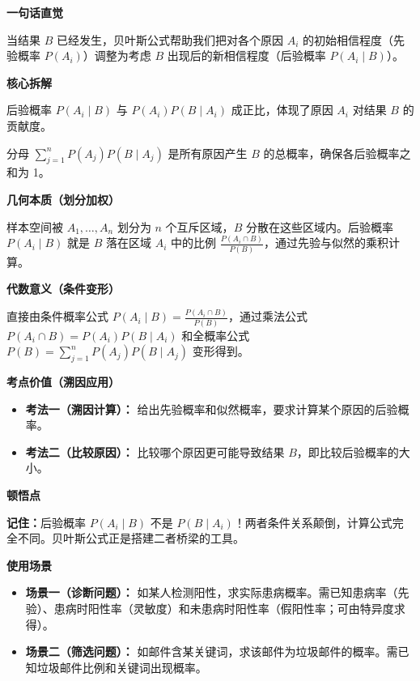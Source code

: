 \begin{explanationbox}
	\textbf{\textcolor{CExplanation}{一句话直觉}}

	当结果 $B$ 已经发生，贝叶斯公式帮助我们把对各个原因 $A_i$ 的初始相信程度（先验概率 $P(A_i)$）调整为考虑 $B$ 出现后的新相信程度（后验概率 $P(A_i\mid B)$）。

	\medskip
	\textbf{\textcolor{CExplanation}{核心拆解}}
	\begin{description}[style=nextline, leftmargin=2.8em, labelsep=0.5em, itemsep=0.45em]
		\item[\textbf{要点一（比例关系）：}] 后验概率 $P(A_i\mid B)$ 与 $P(A_i)P(B\mid A_i)$ 成正比，体现了原因 $A_i$ 对结果 $B$ 的贡献度。
		\item[\textbf{要点二（归一化）：}] 分母 $\sum_{j=1}^{n} P(A_j)P(B\mid A_j)$ 是所有原因产生 $B$ 的总概率，确保各后验概率之和为 1。
	\end{description}

	\medskip
	\textbf{\textcolor{CExplanation}{几何本质（划分加权）}}

	样本空间被 $A_1,\dots,A_n$ 划分为 $n$ 个互斥区域，$B$ 分散在这些区域内。后验概率 $P(A_i\mid B)$ 就是 $B$ 落在区域 $A_i$ 中的比例 $\frac{P(A_i\cap B)}{P(B)}$，通过先验与似然的乘积计算。

	\medskip
	\textbf{\textcolor{CExplanation}{代数意义（条件变形）}}

	直接由条件概率公式 $P(A_i\mid B)=\frac{P(A_i\cap B)}{P(B)}$，通过乘法公式 $P(A_i\cap B)=P(A_i)P(B\mid A_i)$ 和全概率公式 $P(B)=\sum_{j=1}^{n} P(A_j)P(B\mid A_j)$ 变形得到。

	\medskip
	\textbf{\textcolor{CExplanation}{考点价值（溯因应用）}}
	\begin{itemize}[leftmargin=*, itemsep=0.5em, topsep=0.4em]
		\item \textbf{考法一（溯因计算）：} 给出先验概率和似然概率，要求计算某个原因的后验概率。
		\item \textbf{考法二（比较原因）：} 比较哪个原因更可能导致结果 $B$，即比较后验概率的大小。
	\end{itemize}

	\medskip
	\textbf{\textcolor{CExplanation}{顿悟点}}

	\textbf{记住：}后验概率 $P(A_i\mid B)$ 不是 $P(B\mid A_i)$！两者条件关系颠倒，计算公式完全不同。贝叶斯公式正是搭建二者桥梁的工具。

	\medskip
	\textbf{\textcolor{CExplanation}{使用场景}}
	\begin{itemize}[leftmargin=*, itemsep=0.5em, topsep=0.4em]
		\item \textbf{场景一（诊断问题）：} 如某人检测阳性，求实际患病概率。需已知患病率（先验）、患病时阳性率（灵敏度）和未患病时阳性率（假阳性率；可由特异度求得）。
		\item \textbf{场景二（筛选问题）：} 如邮件含某关键词，求该邮件为垃圾邮件的概率。需已知垃圾邮件比例和关键词出现概率。
	\end{itemize}
\end{explanationbox}
